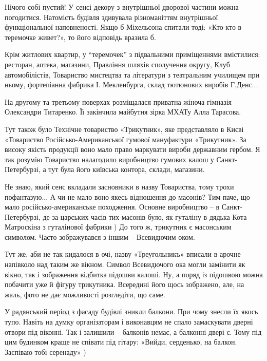 Нічого собі пустий! У сенсі декору з внутрішньої дворової частини можна
погодитися. Натомість будівля здивувала різноманіттям внутрішньої
функціональної наповненості. Якщо б Міхельсона спитали тоді: «Кто-кто в
теремочке живет?», то його відповідь вразила б.

Крім житлових квартир, у \enquote{теремочек} з підвальними приміщеннями вмістилися:
ресторан, аптека, магазини, Правління шляхів сполучення округу, Клуб
автомобілістів, Товариство мистецтва та літератури з театральним училищем при
ньому, фортепіанна фабрика І. Мекленбурга, склад тютюнових виробів Г.Денс...

На другому та третьому поверхах розміщалася приватна жіноча гімназія Олександри
Титаренко. Її закінчила майбутня зірка МХАТу Алла Тарасова.

Тут також було Технічне товариство «Трикутник», яке представляло в Києві
«Товариство Російсько-Американської гумової мануфактури «Трикутник». За високу
якість продукції воно мало право маркувати вироби державним гербом. Я так
розумію Товариство налагодило виробництво гумових калош у Санкт-Петербурзі, а
тут була його київська контора, склади, магазини.

Не знаю, який сенс вкладали засновники в назву Товариства, тому трохи
пофантазую... А чи не мало воно якесь відношення до масонів? Тим паче, що мало
російсько-американське походження. Основне виробництво – в Санкт-Петербурзі, де
за царських часів тих масонів було, як гуталіну в дядька Кота Матроскіна з
гуталінової фабрики ) До того ж, трикутник є масонським символом. Часто
зображувався з іншим – Всевидючим оком.

Тут же, аби не так кидалося в очі, назву «Треугольникъ» вписали в арочне
напівколо над таким же вікном. Символ Всевидючого ока могли замінити як вікно,
так і зображення відбитка підошви калоші. Ну, а поряд із підошвою можна
побачити уже й фігуру трикутника. Всередині його щось зображено, але, на жаль,
фото не дає можливості розгледіти, що саме.

У радянський період з фасаду будівлі зникли балкони. При чому знесли їх якось
тупо. Навіть на думку організаторам і виконавцям не спало замаскувати дверні
отвори під віконні. Так і залишили – балконів немає, а балконні двері є. Тому
під цим будинком краще не співати під гітару: «Вийди, серденько, на балкон.
Заспіваю тобі серенаду» )

